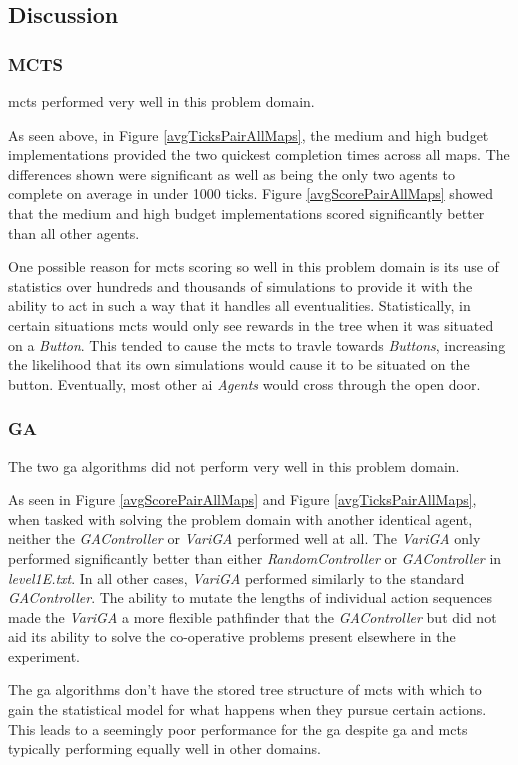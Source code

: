 \documentclass{IEEEtran}
\begin{document}
\subsection{Discussion}
\subsubsection{MCTS}
\gls{mcts} performed very well in this problem domain. 

As seen above, in Figure \ref{avgTicksPairAllMaps}, the medium and high budget implementations provided the two quickest completion times across all maps. The differences shown were significant as well as being the only two agents to complete on average in under 1000 ticks.  Figure \ref{avgScorePairAllMaps} showed that the medium and high budget implementations scored significantly better than all other agents.

One possible reason for \gls{mcts} scoring so well in this problem domain is its use of statistics over hundreds and thousands of simulations to provide it with the ability to act in such a way that it handles all eventualities. Statistically,  in certain situations \gls{mcts} would only see rewards in the tree when it was situated on a \emph{Button}. This tended to cause the \gls{mcts} to travle towards \emph{Buttons}, increasing the likelihood that its own simulations would cause it to be situated on the button. Eventually, most other \gls{ai} \emph{Agents} would cross through the open door.
\subsubsection{GA}
The two \gls{ga} algorithms did not perform very well in this problem domain. 

As seen in Figure \ref{avgScorePairAllMaps} and Figure \ref{avgTicksPairAllMaps}, when tasked with solving the problem domain with another identical agent, neither the \emph{GAController} or \emph{VariGA} performed well at all. The \emph{VariGA} only performed significantly better than either \emph{RandomController} or \emph{GAController} in \emph{level1E.txt}. In all other cases, \emph{VariGA} performed similarly to the standard \emph{GAController}. The ability to mutate the lengths of individual action sequences made the \emph{VariGA} a more flexible pathfinder that the \emph{GAController} but did not aid its ability to solve the co-operative problems present elsewhere in the experiment.

The \gls{ga} algorithms don't have the stored tree structure of \gls{mcts} with which to gain the statistical model for what happens when they pursue certain actions. This leads to a seemingly poor performance for the \gls{ga} despite \gls{ga} and \gls{mcts} typically performing equally well in other domains.
\end{document}
